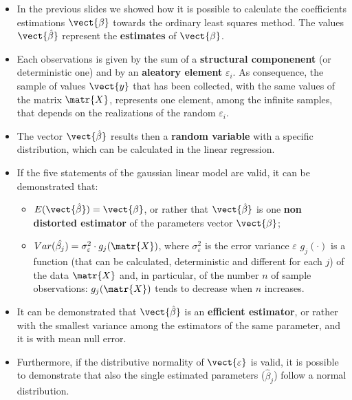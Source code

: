 
\begin{frame}
  \vspace*{.25cm}
  \begin{itemize}
    \item In the previous slides we showed how it is possible to calculate the coefficients estimations  $ \vect{\beta} $ towards the ordinary least squares method. The values $ \vect{\hat{\beta}} $ represent the \textbf{estimates} of $ \vect{\beta} $.
    \vspace*{.25cm}
    \item Each observations is given by the sum of a \textbf{structural componenent} (or deterministic one) and by an \textbf{aleatory element} {$ \varepsilon_i $}. As consequence, the sample of values $ \vect{y} $ that has been collected, with the same values of the matrix $ \matr{X} $, represents one element, among the infinite samples, that depends on the realizations of the random $ \varepsilon_i $.
    \vspace*{.25cm}
    \item The vector $ \vect{\hat{\beta}} $ results then a \textbf{random variable} with a specific distribution, which can be calculated in the linear regression.
  \end{itemize}
\end{frame}

\begin{frame}
  \vspace*{.25cm}
  \begin{itemize}
    \item If the five statements of the gaussian linear model are valid, it can be demonstrated that:
    \begin{itemize}
      \item $ E(\vect{\hat{\beta}}) = \vect{\beta} $, or rather that $ \vect{\hat{\beta}} $ is one \textbf{non distorted estimator} of the parameters vector $ \vect{\beta} $;
      \item $ Var(\hat{\beta_{j}}) = \sigma^2_{\varepsilon} \cdot g_j(\matr{X})$, where $\sigma^2_{\varepsilon}$ is the error variance $\varepsilon$  $g_j(\cdot)$ is a function (that can be calculated, deterministic and different for each $ j $) of the data  $ \matr{X} $ and, in particular, of the number $ n $ of sample observations: $ g_j(\matr{X})$ tends to decrease when $n $ increases.
    \end{itemize}
    \vspace*{.25cm}
    \item It can be demonstrated that { $\vect{\hat{\beta}} $ } is an \textbf{efficient estimator}, or rather with the smallest variance among the estimators of the same parameter, and it is with mean null error.
    \vspace*{.25cm}
    \item Furthermore, if the distributive normality of $ \vect{\varepsilon} $ is valid, it is possible to demonstrate that also the single estimated parameters ($ \hat{\beta}_j $) follow a normal distribution. 
  \end{itemize}
\end{frame}

